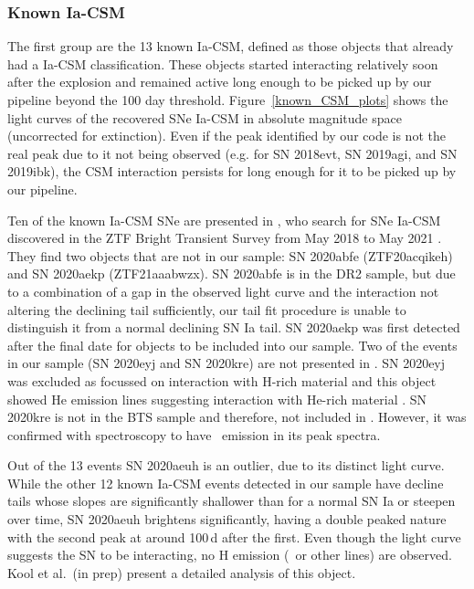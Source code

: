 \documentclass[a4paper,oneside,12pt, class=Latex/Classes/PhDthesisPSnPDF, crop=false]{standalone}
\begin{document}
\subsubsection{Known Ia-CSM}
\label{known-iacsm}
The first group are the 13 known Ia-CSM, defined as those objects that already had a Ia-CSM classification. These objects started interacting relatively soon after the explosion and remained active long enough to be picked up by our pipeline beyond the 100 day threshold. Figure~\ref{known_CSM_plots} shows the light curves of the recovered SNe Ia-CSM in absolute magnitude space (uncorrected for extinction). Even if the peak identified by our code is not the real peak due to it not being observed (e.g. for SN 2018evt, SN 2019agi, and SN 2019ibk), the CSM interaction persists for long enough for it to be picked up by our pipeline.

Ten of the known Ia-CSM SNe are presented in \citet{Ia-CSM_BTS}, who search for SNe Ia-CSM discovered in the ZTF Bright Transient Survey from May 2018 to May 2021 \cite[BTS;][]{BTS-I, BTS-II}. They find two objects that are not in our sample: SN 2020abfe (ZTF20acqikeh) and SN 2020aekp (ZTF21aaabwzx). SN 2020abfe is in the DR2 sample, but due to a combination of a gap in the observed light curve and the interaction not altering the declining tail sufficiently, our tail fit procedure is unable to distinguish it from a normal declining SN Ia tail. SN 2020aekp was first detected after the final date for objects to be included into our sample. Two of the events in our sample (SN 2020eyj and SN 2020kre) are not presented in \citet{Ia-CSM_BTS}. SN 2020eyj was excluded as \citet{Ia-CSM_BTS} focussed on interaction with H-rich material and this object showed He emission lines suggesting interaction with He-rich material \citep{Kool_He_CSM}. SN 2020kre is not in the BTS sample and therefore, not included in \cite{Ia-CSM_BTS}. However, it was confirmed with spectroscopy to have \Halpha~emission in its peak spectra.

Out of the 13 events SN 2020aeuh is an outlier, due to its distinct light curve. While the other 12 known Ia-CSM events detected in our sample have decline tails whose slopes are significantly shallower than for a normal SN Ia or steepen over time, SN 2020aeuh brightens significantly, having a double peaked nature with the second peak at around 100\,d after the first. Even though the light curve suggests the SN to be interacting, no H emission (\Halpha~or other lines) are observed. Kool et al.~(in prep) present a detailed analysis of this object. 
\end{document}
